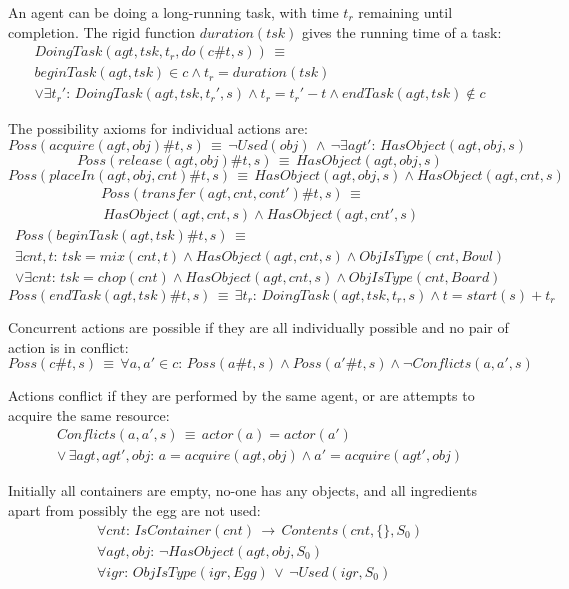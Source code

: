 An agent can be doing a long-running task, with time $t_{r}$ remaining
until completion. The rigid function $duration(tsk)$ gives the running
time of a task:\begin{multline*}
DoingTask(agt,tsk,t_{r},do(c\#t,s))\,\equiv\,\\
beginTask(agt,tsk)\in c\wedge t_{r}=duration(tsk)\\
\vee\exists t_{r}':\, DoingTask(agt,tsk,t_{r}',s)\wedge t_{r}=t_{r}'-t\wedge endTask(agt,tsk)\not\in c\end{multline*}


The possibility axioms for individual actions are:\[
Poss(acquire(agt,obj)\#t,s)\,\equiv\,\neg Used(obj)\,\wedge\,\neg\exists agt':\, HasObject(agt,obj,s)\]
 \[
Poss(release(agt,obj)\#t,s)\,\equiv\, HasObject(agt,obj,s)\]
 \[
Poss(placeIn(agt,obj,cnt)\#t,s)\,\equiv\, HasObject(agt,obj,s)\wedge HasObject(agt,cnt,s)\]
 \begin{multline*}
Poss(transfer(agt,cnt,cont')\#t,s)\,\equiv\\
\, HasObject(agt,cnt,s)\wedge HasObject(agt,cnt',s)\end{multline*}
 \begin{multline*}
Poss(beginTask(agt,tsk)\#t,s)\,\equiv\,\\
\exists cnt,t:\, tsk=mix(cnt,t)\wedge HasObject(agt,cnt,s)\wedge ObjIsType(cnt,Bowl)\\
\vee\exists cnt:\, tsk=chop(cnt)\wedge HasObject(agt,cnt,s)\wedge ObjIsType(cnt,Board)\end{multline*}
 \[
Poss(endTask(agt,tsk)\#t,s)\,\equiv\,\exists t_{r}:\, DoingTask(agt,tsk,t_{r},s)\wedge t=start(s)+t_{r}\]


Concurrent actions are possible if they are all individually possible
and no pair of action is in conflict:\[
Poss(c\#t,s)\,\equiv\,\forall a,a'\in c:\, Poss(a\#t,s)\wedge Poss(a'\#t,s)\wedge\neg Conflicts(a,a',s)\]


Actions conflict if they are performed by the same agent, or are attempts
to acquire the same resource:\begin{multline*}
Conflicts(a,a',s)\,\equiv\, actor(a)=actor(a')\\
\vee\,\exists agt,agt',obj:\, a=acquire(agt,obj)\wedge a'=acquire(agt',obj)\end{multline*}


Initially all containers are empty, no-one has any objects, and all
ingredients apart from possibly the egg are not used:\begin{gather*}
\forall cnt:\, IsContainer(cnt)\,\rightarrow\, Contents(cnt,\{\},S_{0})\\
\forall agt,obj:\,\neg HasObject(agt,obj,S_{0})\\
\forall igr:\, ObjIsType(igr,Egg)\,\vee\,\neg Used(igr,S_{0})\end{gather*}


